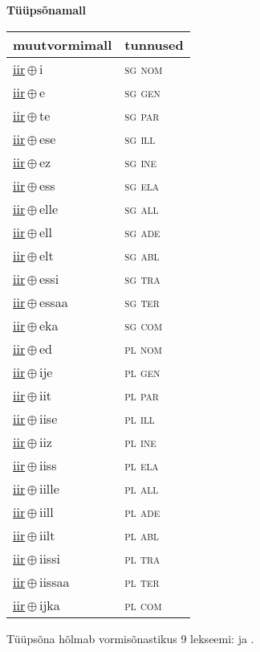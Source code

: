 

\vspace{3.5em}
\noindent \begin{minipage}{\textwidth}
\noindent \textbf{Tüüpsõnamall \,}\\

\begin{sideways}
\begin{tabular}{l l}
muutvormimall & tunnused \\
\hline
\underline{iir}\,$\oplus$\,i & \textsc{ sg nom } \\
\underline{iir}\,$\oplus$\,e & \textsc{ sg gen } \\
\underline{iir}\,$\oplus$\,te & \textsc{ sg par } \\
\underline{iir}\,$\oplus$\,ese & \textsc{ sg ill } \\
\underline{iir}\,$\oplus$\,ez & \textsc{ sg ine } \\
\underline{iir}\,$\oplus$\,ess & \textsc{ sg ela } \\
\underline{iir}\,$\oplus$\,elle & \textsc{ sg all } \\
\underline{iir}\,$\oplus$\,ell & \textsc{ sg ade } \\
\underline{iir}\,$\oplus$\,elt & \textsc{ sg abl } \\
\underline{iir}\,$\oplus$\,essi & \textsc{ sg tra } \\
\underline{iir}\,$\oplus$\,essaa & \textsc{ sg ter } \\
\underline{iir}\,$\oplus$\,eka & \textsc{ sg com } \\
\underline{iir}\,$\oplus$\,ed & \textsc{ pl nom } \\
\underline{iir}\,$\oplus$\,ije & \textsc{ pl gen } \\
\underline{iir}\,$\oplus$\,iit & \textsc{ pl par } \\
\underline{iir}\,$\oplus$\,iise & \textsc{ pl ill } \\
\underline{iir}\,$\oplus$\,iiz & \textsc{ pl ine } \\
\underline{iir}\,$\oplus$\,iiss & \textsc{ pl ela } \\
\underline{iir}\,$\oplus$\,iille & \textsc{ pl all } \\
\underline{iir}\,$\oplus$\,iill & \textsc{ pl ade } \\
\underline{iir}\,$\oplus$\,iilt & \textsc{ pl abl } \\
\underline{iir}\,$\oplus$\,iissi & \textsc{ pl tra } \\
\underline{iir}\,$\oplus$\,iissaa & \textsc{ pl ter } \\
\underline{iir}\,$\oplus$\,ijka & \textsc{ pl com } \\
\end{tabular}
\end{sideways}
\label{tab:tüüpsõnamall-iiri}

\end{minipage}

 
\vspace{1em}
\noindent Tüüpsõna hõlmab vormisõnastikus 9 lekseemi:  ja .

